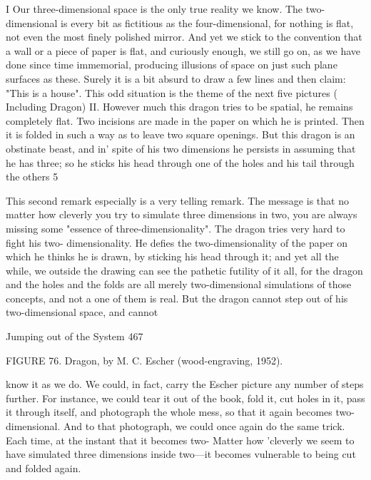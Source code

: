 {  I      Our three-dimensional space is the only true reality we know. The two-
  dimensional is every bit as fictitious as the four-dimensional, for nothing is flat, not
  even the most finely polished mirror. And yet we stick to the convention that a wall
  or a piece of paper is flat, and curiously enough, we still go on, as we have done
  since time immemorial, producing illusions of space on just such plane surfaces as
  these. Surely it is a bit absurd to draw a few lines and then claim: "This is a house".
  This odd situation is the theme of the next five pictures ( Including Dragon)
  II. However much this dragon tries to be spatial, he remains completely flat. Two
  incisions are made in the paper on which he is printed. Then it is folded in such a
  way as to leave two square openings. But this dragon is an obstinate beast, and in'
  spite of his two dimensions he persists in assuming that he has three; so he sticks his
  head through one of the holes and his tail through the others 5

This second remark especially is a very telling remark. The message is that no matter
how cleverly you try to simulate three dimensions in two, you are always missing some
"essence of three-dimensionality". The dragon tries very hard to fight his two-
dimensionality. He defies the two-dimensionality of the paper on which he thinks he is
drawn, by sticking his head through it; and yet all the while, we outside the drawing can
see the pathetic futility of it all, for the dragon and the holes and the folds are all merely
two-dimensional simulations of those concepts, and not a one of them is real. But the
dragon cannot step out of his two-dimensional space, and cannot




Jumping out of the System                                                                 467

FIGURE 76. Dragon, by M. C. Escher (wood-engraving, 1952).

know it as we do. We could, in fact, carry the Escher picture any number of steps further.
For instance, we could tear it out of the book, fold it, cut holes in it, pass it through itself,
and photograph the whole mess, so that it again becomes two-dimensional. And to that
photograph, we could once again do the same trick. Each time, at the instant that it
becomes two- Matter how 'cleverly we seem to have simulated three dimensions inside
two—it becomes vulnerable to being cut and folded again.




}
